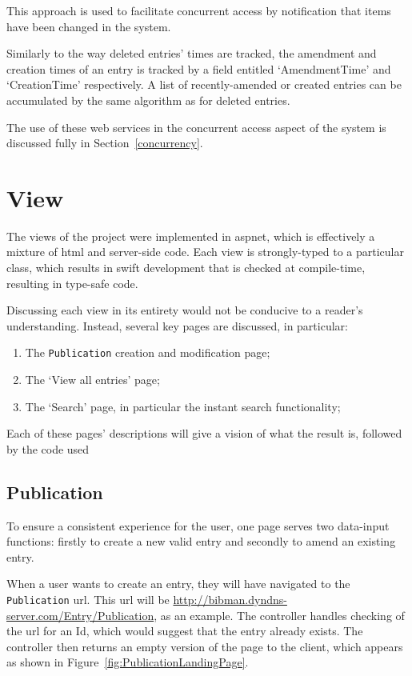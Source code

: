 This approach is used to facilitate concurrent access by notification that items have been changed in the system.  

Similarly to the way deleted entries' times are tracked, the amendment and creation times of an entry is tracked by a field entitled `AmendmentTime' and `CreationTime' respectively.  A list of recently-amended or created entries can be accumulated by the same algorithm as for deleted entries.

The use of these web services in the concurrent access aspect of the system is discussed fully in Section~\ref{concurrency}.

\section{View}
The views of the project were implemented in \gls{asp}\gls{net}, which is effectively a mixture of \gls{html} and \cs{} server-side code.  Each view is strongly-typed to a particular class, which results in swift development that is checked at compile-time, resulting in type-safe code.

Discussing each view in its entirety would not be conducive to a reader's understanding.  Instead, several key pages are discussed, in particular:
\begin{enumerate}
	\item The \texttt{Publication} creation and modification page;
	\item The `View all entries' page;
	\item The `Search' page, in particular the instant search functionality;
\end{enumerate}

Each of these pages' descriptions will give a vision of what the result is, followed by the code used 

\subsection{Publication}
\label{pubPage}
To ensure a consistent experience for the user, one page serves two data-input functions: firstly to create a new valid entry and secondly to amend an existing entry.

When a user wants to create an entry, they will have navigated to the \texttt{Publication} \gls{url}.  This \gls{url} will be \url{http://bibman.dyndns-server.com/Entry/Publication}, as an example.  The controller handles checking of the \gls{url} for an Id, which would suggest that the entry already exists.  The controller then returns an empty version of the page to the client, which appears as shown in Figure~\ref{fig:PublicationLandingPage}.

